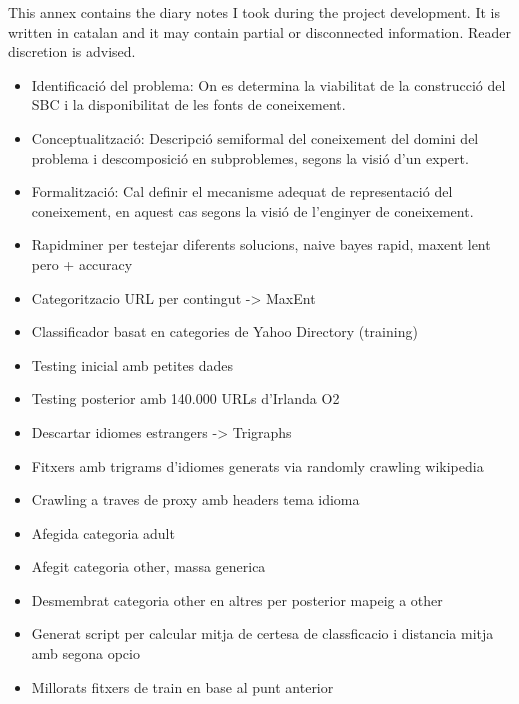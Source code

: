 
This annex contains the diary notes I took during the project development. It is written in catalan and it may contain partial or disconnected information. 
Reader discretion is advised.

\begin{itemize}
  \item Identificació del problema: On es determina la viabilitat de la construcció del SBC i la disponibilitat de les fonts de coneixement.
  \item Conceptualització: Descripció semiformal del coneixement del domini del problema i descomposició en subproblemes, segons la visió d'un expert.
  \item Formalització: Cal definir el mecanisme adequat de representació del coneixement, en aquest cas segons la visió de l'enginyer de coneixement.
  \item Rapidminer per testejar diferents solucions, naive bayes rapid, maxent lent pero + accuracy
  \item Categoritzacio URL per contingut -> MaxEnt
  \item Classificador basat en categories de Yahoo Directory (training)
  \item Testing inicial amb petites dades
  \item Testing posterior amb 140.000 URLs d'Irlanda O2
  \item Descartar idiomes estrangers -> Trigraphs
  \item Fitxers amb trigrams d'idiomes generats via randomly crawling wikipedia
  \item Crawling a traves de proxy amb headers tema idioma
  \item Afegida categoria adult
  \item Afegit categoria other, massa generica
  \item Desmembrat categoria other en altres per posterior mapeig a other
  \item Generat script per calcular mitja de certesa de classficacio i distancia mitja amb segona opcio
  \item Millorats fitxers de train en base al punt anterior
\end{itemize}


